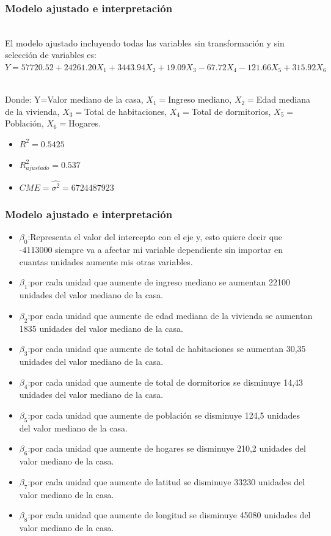 \documentclass[12pt]{beamer}
\begin{document}
\begin{frame}
\frametitle{Modelo ajustado e interpretación}
~\\ El modelo ajustado incluyendo todas las variables sin transformación y sin selección de variables es:
~\\ $Y=57720.52+24261.20X_{1}+3443.94X_{2}+19.09X_{3}-67.72X_{4}-121.66X_{5}+315.92X_{6}$

~\\ Donde: Y=Valor mediano de la casa, $X_{1}=$Ingreso mediano, $X_{2}=$Edad mediana de la vivienda, $X_{3}=$Total de habitaciones, $X_{4}=$Total de dormitorios, $X_{5}=$Población, $X_{6}=$Hogares.
\begin{itemize}
\item $R^2=0.5425$
\item $R^2_{ajustado}=0.537$
\item $CME=\hat{\sigma^2}=6724487923$
\end{itemize}
\end{frame}


\begin{frame}
\frametitle{Modelo ajustado e interpretación}
\begin{itemize}
\item $\beta_{0}$:Representa el valor del intercepto con el eje y, esto quiere decir que -4113000 siempre va a afectar mi variable dependiente sin importar en cuantas unidades aumente mis otras variables.  
\item $\beta_{1}$:por cada unidad que aumente de ingreso mediano se aumentan 22100 unidades del valor mediano de la casa.
\item $\beta_{2}$:por cada unidad que aumente de edad mediana de la vivienda se aumentan 1835 unidades del valor mediano de la casa.
\item $\beta_{3}$:por cada unidad que aumente de total de habitaciones se aumentan 30,35 unidades del valor mediano de la casa.
\item $\beta_{4}$:por cada unidad que aumente de total de dormitorios se disminuye 14,43 unidades del valor mediano de la casa.
\end{itemize}
\end{frame}
\begin{frame}
\begin{itemize}
\item $\beta_{5}$:por cada unidad que aumente de población se disminuye 124,5 unidades del valor mediano de la casa.
\item $\beta_{6}$:por cada unidad que aumente de hogares se disminuye 210,2 unidades del valor mediano de la casa.
\item $\beta_{7}$:por cada unidad que aumente de latitud se disminuye 33230 unidades del valor mediano de la casa.
\item $\beta_{8}$:por cada unidad que aumente de longitud se disminuye 45080 unidades del valor mediano de la casa.
\end{itemize}
\end{frame}
\end{document}
